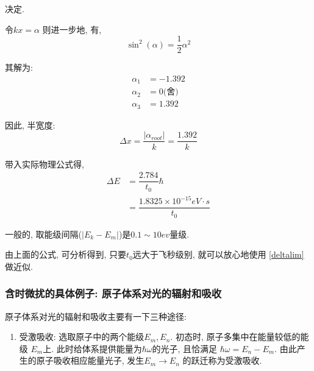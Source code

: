 \documentclass[a4paper, 11pt]{article}
\begin{document}
\begin{spacing}{1.2}
        决定.

        令$kx = \alpha$
        则进一步地, 有,
        \begin{equation}
          \sin^2(\alpha) = \dfrac{1}{2}\alpha^2
        \end{equation}

        其解为:
        \begin{equation}
          \begin{aligned}
            \alpha_1 & = -1.392 \\
            \alpha_2 & = 0\text{(舍)}\\
            \alpha_3 & = 1.392
          \end{aligned}
        \end{equation}
      
        因此, 半宽度:
        \begin{equation}
          \Delta x = \dfrac{|\alpha_{root}|}{k} = \dfrac{1.392}{k}
        \end{equation}

        带入实际物理公式得,
        \begin{equation}
          \begin{aligned}
            \Delta E & = \dfrac{2.784}{t_0}\hbar\\
                     & = \dfrac{1.8325 \times 10^{-15} eV\cdot s}{t_0}
          \end{aligned}
        \end{equation}
        
        一般的, 取能级间隔($|E_k-E_m|$)是$0.1 \sim 10ev$量级.

        由上面的公式, 可分析得到, 只要$t_0$远大于飞秒级别, 就可以放心地使用
        \eqref{deltalim}做近似.
        
        
        \subsubsection{含时微扰的具体例子: 原子体系对光的辐射和吸收}
          原子体系对光的辐射和吸收主要有一下三种途径:

          \begin{enumerate}[*]
            \item 受激吸收: 选取原子中的两个能级$E_m, E_n$. 初态时, 原子多集中在能量较低的能级
                  $E_m$上. 此时给体系提供能量为$\hbar\omega$的光子, 且恰满足
                  $\hbar\omega=E_n-E_m$. 由此产生的原子吸收相应能量光子, 发生$E_m\to E_n$
                  的跃迁称为受激吸收.


\end{enumerate}
\end{spacing}
\end{document}
